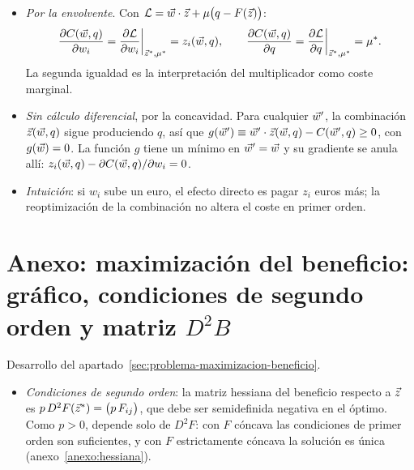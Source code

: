 \documentclass[11pt]{article}
\begin{document}
\begin{itemize}
\item \emph{Por la envolvente}. Con $\mathcal{L}=\vec{w}\cdot\vec{z}+\mu\big(q-F(\vec{z})\big)$:
  \begin{equation*}
  \frac{\partial C(\vec{w},q)}{\partial w_i}=\frac{\partial\mathcal{L}}{\partial w_i}\bigg|_{\vec{z}^*,\mu^*}=z_i(\vec{w},q),\qquad\frac{\partial C(\vec{w},q)}{\partial q}=\frac{\partial\mathcal{L}}{\partial q}\bigg|_{\vec{z}^*,\mu^*}=\mu^*.
  \end{equation*}
  La segunda igualdad es la interpretación del multiplicador como coste marginal.\findemo
\item \emph{Sin cálculo diferencial}, por la concavidad. Para cualquier $\vec{w}'$, la combinación $\vec{z}(\vec{w},q)$ sigue produciendo $q$, así que $g(\vec{w}')\equiv\vec{w}'\cdot\vec{z}(\vec{w},q)-C(\vec{w}',q)\geq 0$, con $g(\vec{w})=0$. La función $g$ tiene un mínimo en $\vec{w}'=\vec{w}$ y su gradiente se anula allí: $z_i(\vec{w},q)-\partial C(\vec{w},q)/\partial w_i=0$\nocite{MasColellWhinstonGreen1995}.\findemo
\item \emph{Intuición}: si $w_i$ sube un euro, el efecto directo es pagar $z_i$ euros más; la reoptimización de la combinación no altera el coste en primer orden.
\end{itemize}

\section{Anexo: maximización del beneficio:\cortetitulo{} gráfico, condiciones de segundo orden y matriz \texorpdfstring{$D^2B$}{D²B}}\label{anexo:beneficio}

Desarrollo del apartado~\ref{sec:problema-maximizacion-beneficio}.

\begin{itemize}
\item \emph{Condiciones de segundo orden}: la matriz hessiana del beneficio respecto a $\vec{z}$ es $p\,D^2F(\vec{z}^*)=\big(p\,F_{ij}\big)$, que debe ser semidefinida negativa en el óptimo. Como $p>0$, depende solo de $D^2F$: con $F$ cóncava las condiciones de primer orden son suficientes, y con $F$ estrictamente cóncava la solución es única (anexo~\ref{anexo:hessiana}).
\end{itemize}
\end{document}
